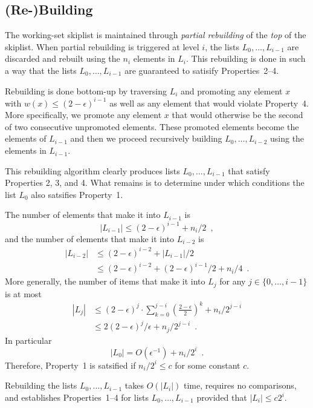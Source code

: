 \documentclass[lotsofwhite]{patmorin}
\begin{document}
\subsection{(Re-)Building}

The working-set skiplist is maintained through \emph{partial rebuilding} of the \emph{top} of the skiplist.  When partial rebuilding is triggered at level $i$, the lists $L_0,\ldots,L_{i-1}$ are discarded and rebuilt using the $n_i$ elements in $L_i$.  This rebuilding is done in such a way that the lists $L_0,\ldots,L_{i-1}$ are guaranteed to satisify Properties~2--4.

Rebuilding is done bottom-up by traversing $L_i$ and promoting any element
$x$ with $w(x)\le (2-\epsilon)^{i-1}$ as well as any element that would
violate Property~4.  More specifically, we promote any element $x$ that
would otherwise be the second of two consecutive unpromoted elements.
These promoted elements become the elements of $L_{i-1}$ and then we
proceed recursively building $L_0,\ldots,L_{i-2}$ using the elements
in $L_{i-1}$.

This rebuilding algorithm clearly produces lists $L_0,\ldots,L_{i-1}$
that satisfy Properties 2, 3, and 4.  What remains is to determine under
which conditions the list $L_0$ also satsifies Property~1.

The number of elements that make it into $L_{i-1}$ is 
\[  |L_{i-1}| \le (2-\epsilon)^{i-1} + n_i/2 \enspace , \]
and the number of elements that make it into $L_{i-2}$ is
\begin{align*}
   |L_{i-2}| & \le (2-\epsilon)^{i-2} + |L_{i-1}|/2 \\
     & \le (2-\epsilon)^{i-2} + (2-\epsilon)^{i-1}/2 + n_i/4 \enspace . 
\end{align*}
More generally, the number of items that make it into $L_j$ for any $j\in \{0,\ldots,i-1\}$ is at most
\begin{align*}
    |L_j| & \le (2-\epsilon)^{j} \cdot \sum_{k=0}^{j-i}\left(\frac{2-\epsilon}{2}\right)^k  + n_i/2^{j-i} \\
       & \le 2(2-\epsilon)^j/\epsilon + n_j/2^{j-i} \enspace .
\end{align*}
In particular
\[
    |L_0| = O(\epsilon^{-1}) + n_i/2^i \enspace .
\]
Therefore, Property~1 is satsified if $n_i/2^i \le c$ for some constant $c$.

\begin{lem}
   Rebuilding the lists $L_0,\ldots,L_{i-1}$ takes $O(|L_i|)$ time,
   requires no comparisons, and establishes Properties~1--4 for lists
   $L_0,\ldots,L_{i-1}$ provided that $|L_i|\le c2^i$.
\end{lem}
\end{document}
